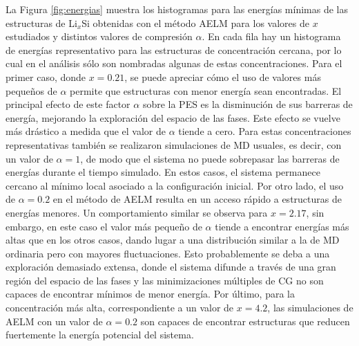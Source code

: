 La Figura \ref{fig:energias} muestra los histogramas para las energías mínimas
de las estructuras de Li$_x$Si obtenidas con el método AELM para los valores de
$x$ estudiados y distintos valores de compresión $\alpha$. En cada fila hay un 
histograma de energías representativo para las estructuras de concentración 
cercana, por lo cual en el análisis sólo son nombradas algunas de estas 
concentraciones. Para el primer caso, donde $x = 0.21$, se puede apreciar cómo el 
uso de valores más pequeños de $\alpha$ permite que estructuras con menor energía 
sean encontradas. El principal efecto de este factor $\alpha$ sobre la PES es la 
disminución de sus barreras de energía, mejorando la exploración del espacio de 
las fases. Este efecto se vuelve más drástico a medida que el valor de $\alpha$ 
tiende a cero. Para estas concentraciones representativas también se realizaron 
simulaciones de MD usuales, es decir, con un valor de $\alpha = 1$, de modo que el sistema no 
puede sobrepasar las barreras de energías durante el tiempo simulado. En estos casos, el sistema 
permanece cercano al mínimo local asociado a la configuración inicial. Por otro 
lado, el uso de $\alpha = 0.2$ en el método de AELM resulta en un acceso rápido
a estructuras de energías menores. Un comportamiento similar se observa para 
$x = 2.17$, sin embargo, en este caso el valor más pequeño de $\alpha$ tiende a 
encontrar energías más altas que en los otros casos, dando lugar a una distribución
similar a la de MD ordinaria pero con mayores fluctuaciones. Esto probablemente 
se deba a una exploración demasiado extensa, donde el sistema difunde a través
de una gran región del espacio de las fases y las minimizaciones múltiples de 
CG no son capaces de encontrar mínimos de menor energía. Por último, para la 
concentración más alta, correspondiente a un valor de $x = 4.2$, las simulaciones 
de AELM con un valor de $\alpha = 0.2$ son capaces de encontrar estructuras que 
reducen fuertemente la energía potencial del sistema. 
